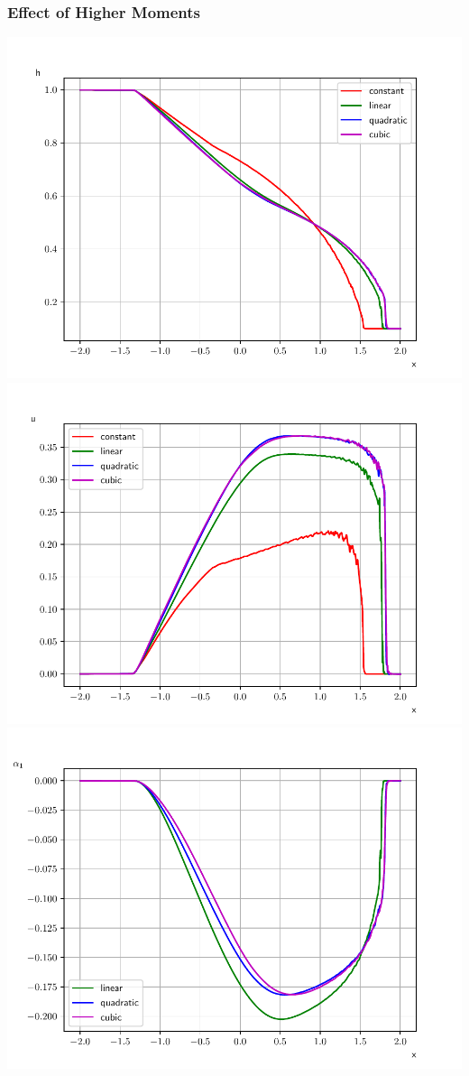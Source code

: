 \documentclass[10pt]{beamer}
\begin{document}
    \begin{frame}
        \frametitle{Effect of Higher Moments}
        \centering
        \includegraphics[scale=0.29]{Figures/height_dam.pdf}
        \includegraphics[scale=0.29]{Figures/mean_velocity_dam.pdf}
        \includegraphics[scale=0.29]{Figures/alpha_1_dam.pdf}

\end{frame}
\end{document}
